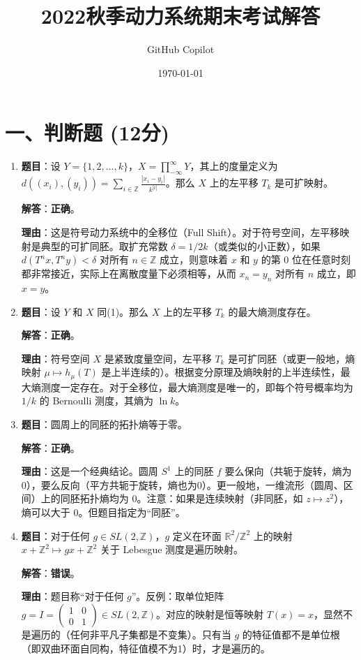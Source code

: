 \documentclass[a4paper,12pt]{article}
\title{2022秋季动力系统期末考试解答}
\author{GitHub Copilot}
\date{\today}
\begin{document}
\maketitle

\section*{一、判断题 (12分)}

\begin{enumerate}
    \item \textbf{题目}：设 $Y=\{1, 2, \dots, k\}$，$X = \prod_{-\infty}^{\infty} Y$，其上的度量定义为 $d((x_i), (y_i)) = \sum_{i \in \mathbb{Z}} \frac{|x_i - y_i|}{k^{|i|}}$。那么 $X$ 上的左平移 $T_k$ 是可扩映射。
    
    \textbf{解答}：\textbf{正确}。
    
    \textbf{理由}：这是符号动力系统中的全移位（Full Shift）。对于符号空间，左平移映射是典型的可扩同胚。取扩充常数 $\delta = 1/2k$（或类似的小正数），如果 $d(T^n x, T^n y) < \delta$ 对所有 $n \in \mathbb{Z}$ 成立，则意味着 $x$ 和 $y$ 的第 0 位在任意时刻都非常接近，实际上在离散度量下必须相等，从而 $x_n = y_n$ 对所有 $n$ 成立，即 $x=y$。

    \item \textbf{题目}：设 $Y$ 和 $X$ 同(1)。那么 $X$ 上的左平移 $T_k$ 的最大熵测度存在。
    
    \textbf{解答}：\textbf{正确}。
    
    \textbf{理由}：符号空间 $X$ 是紧致度量空间，左平移 $T_k$ 是可扩同胚（或更一般地，熵映射 $\mu \mapsto h_\mu(T)$ 是上半连续的）。根据变分原理及熵映射的上半连续性，最大熵测度一定存在。对于全移位，最大熵测度是唯一的，即每个符号概率均为 $1/k$ 的 Bernoulli 测度，其熵为 $\ln k$。

    \item \textbf{题目}：圆周上的同胚的拓扑熵等于零。
    
    \textbf{解答}：\textbf{正确}。
    
    \textbf{理由}：这是一个经典结论。圆周 $S^1$ 上的同胚 $f$ 要么保向（共轭于旋转，熵为0），要么反向（平方共轭于旋转，熵也为0）。更一般地，一维流形（圆周、区间）上的同胚拓扑熵均为 0。注意：如果是连续映射（非同胚，如 $z \mapsto z^2$），熵可以大于 0。但题目指定为“同胚”。

    \item \textbf{题目}：对于任何 $g \in SL(2, \mathbb{Z})$，$g$ 定义在环面 $\mathbb{R}^2/\mathbb{Z}^2$ 上的映射 $x+\mathbb{Z}^2 \mapsto gx+\mathbb{Z}^2$ 关于 Lebesgue 测度是遍历映射。
    
    \textbf{解答}：\textbf{错误}。
    
    \textbf{理由}：题目称“对于任何 $g$”。反例：取单位矩阵 $g = I = \begin{pmatrix} 1 & 0 \\ 0 & 1 \end{pmatrix} \in SL(2, \mathbb{Z})$。对应的映射是恒等映射 $T(x) = x$，显然不是遍历的（任何非平凡子集都是不变集）。只有当 $g$ 的特征值都不是单位根（即双曲环面自同构，特征值模不为1）时，才是遍历的。
\end{enumerate}
\end{document}
